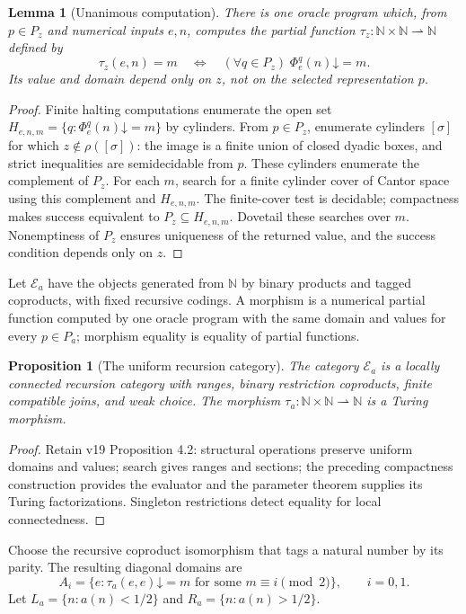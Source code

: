 \documentclass[11pt]{article}
\newtheorem{lemma}[theorem]{Lemma}
\newtheorem{proposition}[theorem]{Proposition}
\theoremstyle{definition}\newtheorem{definition}[theorem]{Definition}
\newcommand{\N}{\mathbb N}
\newcommand{\E}{\mathcal E}
\begin{document}
\begin{lemma}[Unanimous computation]\label{lem:miller-unanimity}
There is one oracle program which, from $p\in P_z$ and numerical
inputs $e,n$, computes the partial function
$\tau_z:\N\times\N\rightharpoonup\N$ defined by
\[
 \tau_z(e,n)=m\quad\Longleftrightarrow\quad
 (\forall q\in P_z)\;\Phi_e^q(n)\mathord\downarrow=m.
\]
Its value and domain depend only on $z$, not on the selected
representation $p$.
\end{lemma}
\begin{proof}
Finite halting computations enumerate the open set
$H_{e,n,m}=\{q:\Phi_e^q(n)\mathord\downarrow=m\}$ by cylinders.
From $p\in P_z$, enumerate cylinders $[\sigma]$ for which
$z\notin\rho([\sigma])$: the image is a finite union of closed
dyadic boxes, and strict inequalities are semidecidable from $p$.
These cylinders enumerate the complement of $P_z$. For each $m$,
search for a finite cylinder cover of Cantor space using this
complement and $H_{e,n,m}$. The finite-cover test is decidable;
compactness makes success equivalent to $P_z\subseteq H_{e,n,m}$.
Dovetail these searches over $m$. Nonemptiness of $P_z$ ensures
uniqueness of the returned value, and the success condition depends
only on $z$.
\end{proof}

Let $\E_a$ have the objects generated from $\N$ by binary
products and tagged coproducts, with fixed recursive codings.
A morphism is a numerical partial function computed by one oracle
program with the same domain and values for every $p\in P_a$;
morphism equality is equality of partial functions.

\begin{proposition}[The uniform recursion category]\label{prop:miller-category}
The category $\E_a$ is a locally connected recursion category with
ranges, binary restriction coproducts, finite compatible joins,
and weak choice. The morphism
$\tau_a:\N\times\N\rightharpoonup\N$ is a Turing morphism.
\end{proposition}
\begin{proof}
Retain v19 Proposition 4.2: structural operations preserve uniform
domains and values; search gives ranges and sections; the preceding
compactness construction provides the evaluator and the parameter
theorem supplies its Turing factorizations. Singleton restrictions
detect equality for local connectedness.
\end{proof}

Choose the recursive coproduct isomorphism that tags a natural
number by its parity. The resulting diagonal domains are
\[
 A_i=\{e:\tau_a(e,e)\mathord\downarrow=m
                 \text{ for some }m\equiv i\pmod 2\},
 \qquad i=0,1.
\]
Let
$L_a=\{n:a(n)<1/2\}$ and $R_a=\{n:a(n)>1/2\}$.
\end{document}
